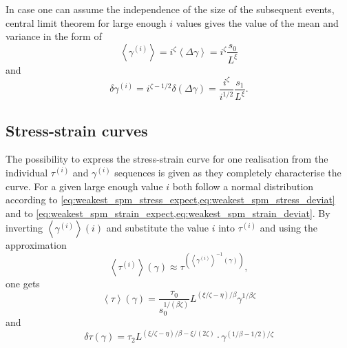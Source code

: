 In case one can assume the independence of the size of the subsequent events, central limit theorem for large enough $i$ values gives the value of the mean and variance in the form of 
\begin{equation} \label{eq:weakest_spm_strain_expect}
\left\langle {{\gamma ^{\left( i \right)}}} \right\rangle  = {i^\zeta }\left\langle {\Delta \gamma } \right\rangle  = {i^\zeta }\frac{{{s_0}}}{{{L^\xi }}}
\end{equation}
and
\begin{equation} \label{eq:weakest_spm_strain_deviat}
\delta {\gamma ^{\left( i \right)}} = {i^{\zeta  - 1/2}}\delta \left( {\Delta \gamma } \right) = \frac{{{i^\zeta }}}{{{i^{1/2}}}}\frac{{{s_1}}}{{{L^\xi }}}.
\end{equation}

\subsection{Stress-strain curves}
The possibility to express the stress-strain curve for one realisation from the individual ${\tau ^{\left( i \right)}}$ and ${\gamma ^{\left( i \right)}}$ sequences is given as they completely characterise the curve. For a given large enough value $i$ both follow a normal distribution according to \cref{eq:weakest_spm_stress_expect,eq:weakest_spm_stress_deviat} and to \cref{eq:weakest_spm_strain_expect,eq:weakest_spm_strain_deviat}. By inverting $\left\langle {{\gamma ^{\left( i \right)}}} \right\rangle \left( i \right)$ and substitute the value $i$ into ${\tau ^{\left( i \right)}}$ and using the approximation 
\begin{equation}
\left\langle {{\tau ^{\left( i \right)}}} \right\rangle \left( \gamma  \right) \approx {\tau ^{\left( {{{\left\langle {{\gamma ^{\left( i \right)}}} \right\rangle }^{ - 1}}\left( \gamma  \right)} \right)}},
\end{equation}
one gets 
\begin{equation} \label{eq:weakest_spm_stress_expect_manyexp}
\left\langle \tau  \right\rangle \left( \gamma  \right) = \frac{{{\tau _0}}}{{s_0^{1/\left( {\beta \zeta } \right)}}}{L^{\left( {\xi /\zeta  - \eta } \right)/\beta }}{\gamma ^{1/\beta \zeta }}
\end{equation}
and 
\begin{equation} \label{eq:weakest_spm_stress_deviat_manyexp}
\delta \tau \left( \gamma  \right) = {\tau _2}{L^{\left( {\xi /\zeta  - \eta } \right)/\beta  - \xi /\left( {2\zeta } \right)}} \cdot {\gamma ^{\left( {1/\beta  - 1/2} \right)/\zeta }}
\end{equation}
